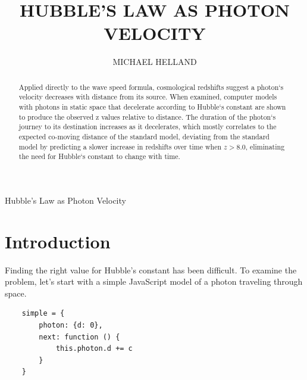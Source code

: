 \documentclass{ws-mpla}
\begin{document}
{Hubble's Law as Photon Velocity}

\catchline{}{}{}{}{}

\title{HUBBLE'S LAW AS PHOTON VELOCITY}

\author{\footnotesize MICHAEL HELLAND}

\address{Seattle, WA 98134,
United States\\
mike@mikehelland.com}


\maketitle


\begin{abstract}
Applied directly to the wave speed formula, cosmological redshifts suggest a photon`s velocity decreases with distance from its source. 
When examined, computer models with photons in static space that decelerate according to Hubble`s constant are shown to produce the observed 
z values relative to distance. The duration of the photon`s journey to its destination increases 
as it decelerates, which mostly correlates to the expected co-moving distance of the standard model, deviating from the 
standard model by predicting a slower increase in redshifts over time when $z > 8.0$, eliminating the need for Hubble`s 
constant to change with time. 

\end{abstract}


\section{Introduction}	

Finding the right value for Hubble's constant has been difficult.\cite{Riess}\cite{Planck} To examine the problem, let's start with a simple JavaScript model of a photon
traveling through space. 

\begin{verbatim}
    simple = {
        photon: {d: 0},
        next: function () {
            this.photon.d += c
        }
    }
\end{verbatim}
\end{document}
